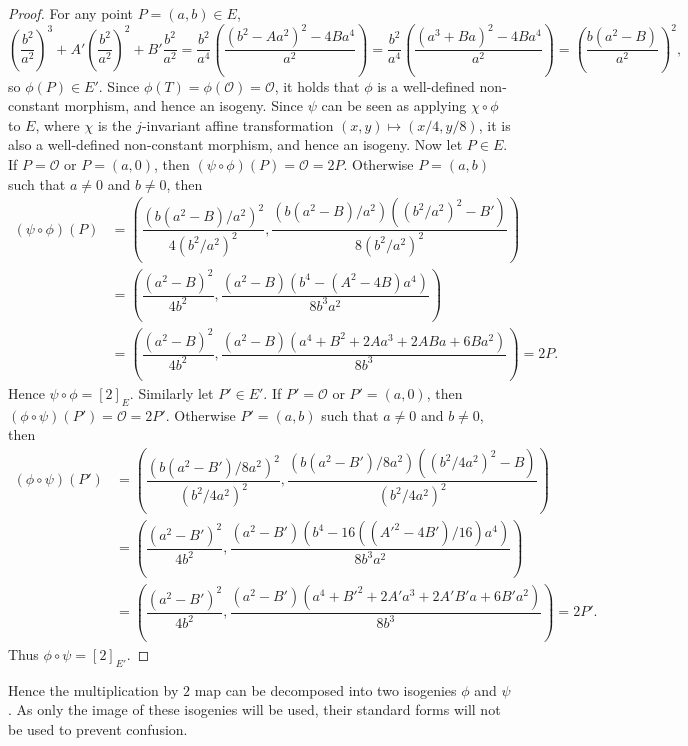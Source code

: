 \documentclass{article}
\newcommand{\rb}[1]{\left( #1 \right)}
\renewcommand{\sb}[1]{\left[ #1 \right]}
\theoremstyle{definition}
\begin{document}
\begin{proof}
For any point $ P = \rb{a, b} \in E $,
$$ \rb{\dfrac{b^2}{a^2}}^3 + A'\rb{\dfrac{b^2}{a^2}}^2 + B'\dfrac{b^2}{a^2}
= \dfrac{b^2}{a^4}\rb{\dfrac{\rb{b^2 - Aa^2}^2 - 4Ba^4}{a^2}}
= \dfrac{b^2}{a^4}\rb{\dfrac{\rb{a^3 + Ba}^2 - 4Ba^4}{a^2}}
= \rb{\dfrac{b\rb{a^2 - B}}{a^2}}^2, $$
so $ \phi\rb{P} \in E' $. Since $ \phi\rb{T} = \phi\rb{\mathcal{O}} = \mathcal{O} $, it holds that $ \phi $ is a well-defined non-constant morphism, and hence an isogeny. Since $ \psi $ can be seen as applying $ \chi \circ \phi $ to $ E $, where $ \chi $ is the $ j $-invariant affine transformation $ \rb{x, y} \mapsto \rb{x / 4, y / 8} $, it is also a well-defined non-constant morphism, and hence an isogeny. Now let $ P \in E $. If $ P = \mathcal{O} $ or $ P = \rb{a, 0} $, then $ \rb{\psi \circ \phi}\rb{P} = \mathcal{O} = 2P $. Otherwise $ P = \rb{a, b} $ such that $ a \ne 0 $ and $ b \ne 0 $, then
\begin{align*}
\rb{\psi \circ \phi}\rb{P}
& = \rb{\dfrac{\rb{b\rb{a^2 - B} / a^2}^2}{4\rb{b^2 / a^2}^2}, \dfrac{\rb{b\rb{a^2 - B} / a^2}\rb{\rb{b^2 / a^2}^2 - B'}}{8\rb{b^2 / a^2}^2}} \\
& = \rb{\dfrac{\rb{a^2 - B}^2}{4b^2}, \dfrac{\rb{a^2 - B}\rb{b^4 - \rb{A^2 - 4B}a^4}}{8b^3a^2}} \\
& = \rb{\dfrac{\rb{a^2 - B}^2}{4b^2}, \dfrac{\rb{a^2 - B}\rb{a^4 + B^2 + 2Aa^3 + 2ABa + 6Ba^2}}{8b^3}} = 2P.
\end{align*}
Hence $ \psi \circ \phi = \sb{2}_E $. Similarly let $ P' \in E' $. If $ P' = \mathcal{O} $ or $ P' = \rb{a, 0} $, then $ \rb{\phi \circ \psi}\rb{P'} = \mathcal{O} = 2P' $. Otherwise $ P' = \rb{a, b} $ such that $ a \ne 0 $ and $ b \ne 0 $, then
\begin{align*}
\rb{\phi \circ \psi}\rb{P'}
& = \rb{\dfrac{\rb{b\rb{a^2 - B'} / 8a^2}^2}{\rb{b^2 / 4a^2}^2}, \dfrac{\rb{b\rb{a^2 - B'} / 8a^2}\rb{\rb{b^2 / 4a^2}^2 - B}}{\rb{b^2 / 4a^2}^2}} \\
& = \rb{\dfrac{\rb{a^2 - B'}^2}{4b^2}, \dfrac{\rb{a^2 - B'}\rb{b^4 - 16\rb{\rb{A'^2 - 4B'} / 16}a^4}}{8b^3a^2}} \\
& = \rb{\dfrac{\rb{a^2 - B'}^2}{4b^2}, \dfrac{\rb{a^2 - B'}\rb{a^4 + B'^2 + 2A'a^3 + 2A'B'a + 6B'a^2}}{8b^3}} = 2P'.
\end{align*}
Thus $ \phi \circ \psi = \sb{2}_{E'} $.
\end{proof}

Hence the multiplication by $ 2 $ map can be decomposed into two isogenies $ \phi $ and $ \psi $. As only the image of these isogenies will be used, their standard forms will not be used to prevent confusion.
\end{document}
